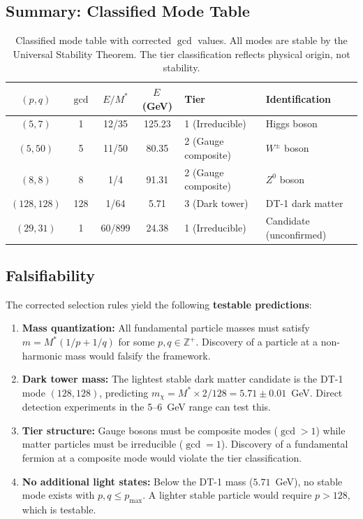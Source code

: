 \subsection{Summary: Classified Mode Table}

\begin{table}[H]
\centering
\begin{tabular}{ccccll}
\toprule
$(p,q)$ & $\gcd$ & $E/M^*$ & $E$\,(GeV) & Tier & Identification \\
\midrule
$(5,7)$   & 1   & 12/35  & 125.23 & 1 (Irreducible) & Higgs boson \\
$(5,50)$  & 5   & 11/50  & 80.35  & 2 (Gauge composite) & $W^\pm$ boson \\
$(8,8)$   & 8   & 1/4    & 91.31  & 2 (Gauge composite) & $Z^0$ boson \\
$(128,128)$ & 128 & 1/64 & 5.71   & 3 (Dark tower)  & DT-1 dark matter \\
$(29,31)$ & 1   & 60/899 & 24.38  & 1 (Irreducible) & Candidate (unconfirmed) \\
\bottomrule
\end{tabular}
\caption{Classified mode table with corrected $\gcd$ values.  All modes are stable by the Universal Stability Theorem.  The tier classification reflects physical origin, not stability.}
\label{tab:mode_classification}
\end{table}

\subsection{Falsifiability}

The corrected selection rules yield the following \textbf{testable predictions}:
\begin{enumerate}
    \item \textbf{Mass quantization:} All fundamental particle masses must satisfy $m = M^*(1/p + 1/q)$ for some $p,q \in \mathbb{Z}^+$.  Discovery of a particle at a non-harmonic mass would falsify the framework.
    \item \textbf{Dark tower mass:} The lightest stable dark matter candidate is the DT-1 mode $(128,128)$, predicting $m_\chi = M^* \times 2/128 = 5.71 \pm 0.01$~GeV.  Direct detection experiments in the 5--6~GeV range can test this.
    \item \textbf{Tier structure:} Gauge bosons must be composite modes ($\gcd > 1$) while matter particles must be irreducible ($\gcd = 1$).  Discovery of a fundamental fermion at a composite mode would violate the tier classification.
    \item \textbf{No additional light states:} Below the DT-1 mass ($5.71$~GeV), no stable mode exists with $p,q \le p_{\max}$.  A lighter stable particle would require $p > 128$, which is testable.
\end{enumerate}

